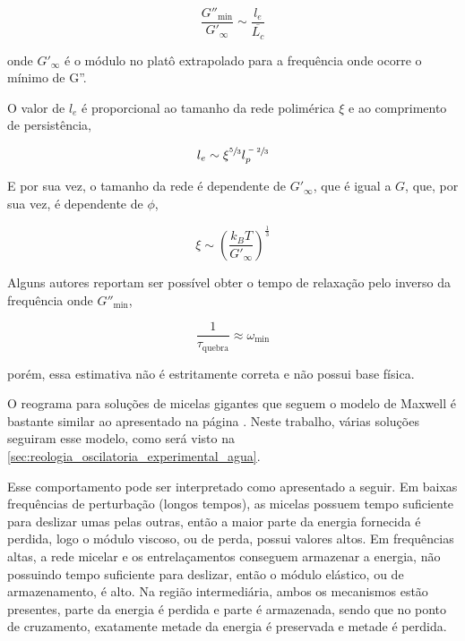 		\begin{equation}
			\frac{G''_\mathrm{min}}{G'_\infty} \sim \frac{l_e}{\overline{L_c}}
			\label{eqn:mesh_contorno_por_reologia}
		\end{equation} %

		\noindent onde \(G'_\infty\) é o módulo no platô extrapolado para a frequência onde ocorre o mínimo de G''.
		
		O valor de \(l_e\) é proporcional ao tamanho da rede polimérica \(\xi\) e ao comprimento de persistência, \cite{Berret1993a}
		
		\begin{equation}
			l_e \sim \xi^{\sfrac{5}{3}} l_p^{\sfrac{-2}{3}}
			\label{eqn:mesh_comprimento_entrelacamento}
		\end{equation} %
		
		E por sua vez, o tamanho da rede é dependente de \(G'_\infty\), que é igual a \(G\), que, por sua vez, é dependente de \(\phi\), \cite{Berret1993a}
		
		\begin{equation}
			\xi \sim \left(  \frac{k_BT}{G'_\infty} \right) ^ \frac{1}{3}
		\end{equation} %
		
		Alguns autores reportam ser possível obter o tempo de relaxação pelo inverso da frequência onde \(G''_\textrm{min}\),
		
		\begin{equation}
			\dfrac{1}{\tau_{\mathrm{quebra}}} \approx \omega_{\textrm{min}}
			\label{eqn:tauquebra_g2min}
		\end{equation}
		
		\noindent porém, essa estimativa não é estritamente correta e não possui base física.\cite{CalabreseTese}
	
		O reograma para soluções de micelas gigantes que seguem o modelo de Maxwell é bastante similar ao apresentado na página \pageref{fig:modelo_maxwell}. Neste trabalho, várias soluções seguiram esse modelo, como será visto na \autoref{sec:reologia_oscilatoria_experimental_agua}.
		
		Esse comportamento pode ser interpretado como apresentado a seguir. Em baixas frequências de perturbação (longos tempos), as micelas possuem tempo suficiente para deslizar umas pelas outras, então a maior parte da energia fornecida é perdida, logo o módulo viscoso, ou de perda, possui valores altos. Em frequências altas, a rede micelar e os entrelaçamentos conseguem armazenar a energia, não possuindo tempo suficiente para deslizar, então o módulo elástico, ou de armazenamento, é alto. Na região intermediária, ambos os mecanismos estão presentes, parte da energia é perdida e parte é armazenada, sendo que no ponto de cruzamento, exatamente metade da energia é preservada e metade é perdida.
		
